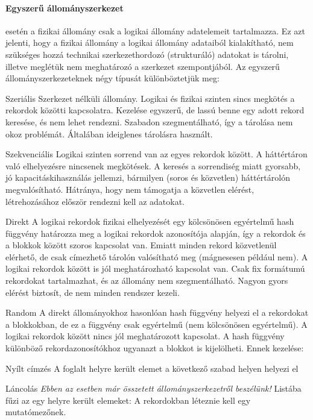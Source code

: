 \paragraph{Egyszerű állományszerkezet} esetén a fizikai állomány csak a logikai állomány adatelemeit tartalmazza. Ez azt jelenti, hogy a fizikai állomány a logikai állomány adataiból kialakítható, nem szükséges hozzá technikai szerkezethordozó (strukturáló) adatokat is tárolni, illetve meglétük nem meghatározó a szerkezet szempontjából. Az egyszerű állományszerkezeteknek négy típusát különböztetjük meg:
\begin{enumdescript}[nosep]
	\item[Szeriális] Szerkezet nélküli állomány. Logikai és fizikai szinten sincs megkötés a rekordok közötti kapcsolatra. Kezelése egyszerű, de lassú benne egy adott rekord keresése, és nem lehet rendezni. Szabadon szegmentálható, így a tárolása nem okoz problémát. Általában ideiglenes tárolásra használt.
	\item[Szekvenciális] Logikai szinten sorrend van az egyes rekordok között. A háttértáron való elhelyezésre nincsenek megkötések. A keresés a sorrendiség miatt gyorsabb, jó kapacitáskihasználás jellemzi, bármilyen (soros és közvetlen) háttértárolón megvalósítható. Hátránya, hogy nem támogatja a közvetlen elérést, létrehozásához először rendezni kell az adatokat.
	\item[Direkt] A logikai rekordok fizikai elhelyezését egy kölcsönösen egyértelmű hash függvény határozza meg a logikai rekordok azonosítója alapján, így a rekordok és a blokkok között szoros kapcsolat van. Emiatt minden rekord közvetlenül elérhető, de csak címezhető tárolón valósítható meg (mágnesesen például nem). A logikai rekordok között is jól meghatározható kapcsolat van. Csak fix formátumú rekordokat tartalmazhat, és az állomány nem szegmentálható. Nagyon gyors elérést biztosít, de nem minden rendszer kezeli.
	\item[Random] A direkt állományokhoz hasonlóan hash függvény helyezi el a rekordokat a blokkokban, de ez a függvény csak egyértelmű (nem kölcsönösen egyértelmű). A logikai rekordok között nincs jól meghatározott kapcsolat. A hash függvény különböző rekordazonosítókhoz ugyanazt a blokkot is kijelölheti. Ennek kezelése:
	\begin{enumdescript}[noitemsep]
		\item[Nyílt címzés] A foglalt helyre került elemet a következő szabad helyen helyezi el
		\item[Láncolás] \emph{Ebben az esetben már összetett állományszerkezetről beszélünk!} Listába fűzi az egy helyre került elemeket: A rekordokban léteznie kell egy mutatómezőnek.
	\end{enumdescript}
\end{enumdescript}

